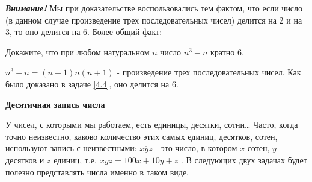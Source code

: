 \textit{\textbf{Внимание!}} Мы при доказательстве воспользовались тем фактом, что если число (в данном случае произведение трех последовательных чисел) делится на 2 и на 3, то оно делится на 6. Более общий факт: 


\begin{thm} 
	Докажите, что при любом натуральном $n$ число $n^3 - n$ кратно 6.
\end{thm}

\begin{dok}
    $n^3 - n  =  (n - 1) n (n + 1)$ - произведение трех последовательных чисел. Как было доказано в задаче \ref{4.4}, оно делится на 6.
\end{dok}
\begin{floatingfigure}[L]{0\textwidth}
\end{floatingfigure}

\begin{center}
	{\large\textbf{Десятичная запись числа}}
\end{center}


У чисел, с которыми мы работаем, есть единицы, десятки, сотни… Часто, когда точно неизвестно, каково количество этих самых единиц, десятков, сотен, используют запись с неизвестными: $\overline{xyz}$ - это число, в котором $x$ сотен, $y$ десятков и $z$ единиц, т.е. $\overline{xyz} = 100x + 10y + z$ . В следующих двух  задачах будет полезно представлять числа именно в таком виде. 

